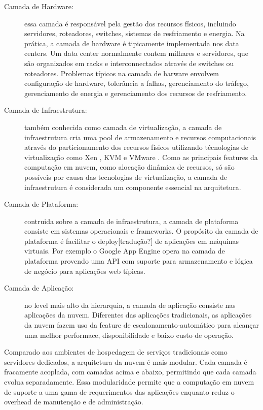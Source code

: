 \begin{description}

	\item[Camada de Hardware:] essa camada é responsável pela gestão dos recursos físicos, incluindo servidores, roteadores, switches, sistemas de resfriamento e energia. Na prática, a camada de hardware é tipicamente implementada nos data centers. Um data center normalmente contem milhares e servidores, que são organizados em racks e interconnectados através de switches ou roteadores. Problemas típicos na camada de harware envolvem configuração de hardware, tolerância a falhas, gerenciamento do tráfego, gerenciamento de energia e gerenciamento dos recursos de resfriamento.

	\item[Camada de Infraestrutura:] também conhecida como camada de virtualização, a camada de infraestrutura cria uma pool de armazenamento e recursos computacionais através do particionamento dos recursos físicos utilizando técnologias de virtualização como Xen \cite{Xen:Online}, KVM \cite{KVM:Online} e VMware \cite{VMware:Online}. Como as principais features da computação em nuvem, como alocação dinâmica de recursos, só são possíveis por causa das tecnologias de virtualização, a camada de infraestrutura é considerada um componente essencial na arquitetura.

	\item[Camada de Plataforma:] contruida sobre a camada de infraestrutura, a camada de plataforma consiste em sistemas operacionais e frameworks. O propósito da camada de plataforma é facilitar o deploy[tradução?] de aplicações em máquinas virtuais. Por exemplo o Google App Engine opera na camada de plataforma provendo uma API com suporte para armazenamento e lógica de negócio para aplicações web típicas. 

	\item[Camada de Aplicação:] no level mais alto da hierarquia, a camada de aplicação consiste nas aplicações da nuvem. Diferentes das aplicações tradicionais, as aplicações da nuvem fazem uso da feature de escalonamento-automático para alcançar uma melhor performace, disponibilidade e baixo custo de operação.

\end{description}

Comparado aos ambientes de hospedagem de serviços tradicionais como servidores dedicados, a arquitetura da nuvem é mais modular. Cada camada é fracamente acoplada, com camadas acima e abaixo, permitindo que cada camada evolua separadamente. Essa modularidade permite que a computação em nuvem de suporte a uma gama de requerimentos das aplicações enquanto reduz o overhead de manutenção e de administração.

